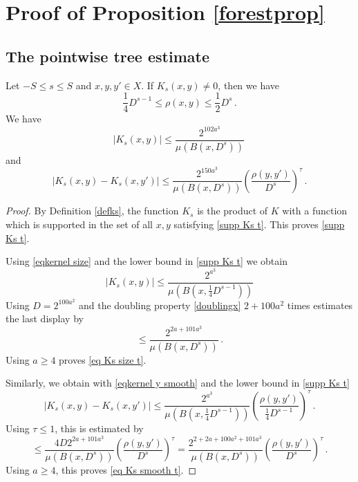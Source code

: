 \chapter{Proof of Proposition \ref{forestprop}}

\label{treesection}

\section{The pointwise tree estimate}


\begin{lemma}
Let $-S\le s\le S$ and $x,y,y'\in X$.
If $K_s(x,y)\neq 0$, then we have
\begin{equation}\label{supp Ks t}
    \frac{1}{4} D^{s-1} \leq \rho(x,y) \leq \frac{1}{2} D^s\, .
\end{equation}
We have
\begin{equation}
    \label{eq Ks size t}
    |K_s(x,y)|\le \frac{2^{102 a^3}}{\mu(B(x, D^{s}))}\,
\end{equation}
and \begin{equation}
    \label{eq Ks smooth t}
    |K_s(x,y)-K_s(x, y')|\le \frac{2^{150a^3}}{\mu(B(x, D^{s}))}
    \left(\frac{ \rho(y,y')}{D^s}\right)^{\tau}\,.
\end{equation}
\end{lemma}

\begin{proof}
By Definition \eqref{defks}, the function $K_s$ is the product of
$K$ with a function which is supported in the set of all
$x,y$ satisfying \eqref{supp Ks t}. This proves \eqref{supp Ks t}.

Using \eqref{eqkernel size} and the lower bound in \eqref{supp Ks t}
we obtain
\begin{equation}
|K_s(x,y)|\le \frac{2^{a^3}}{\mu(B(x,\frac 14 D^{s-1}))}
\end{equation}
Using $D=2^{100a^2}$
and the doubling property \eqref{doublingx} $2 +100a^2$ times estimates
the last display by
\begin{equation}
\label{eq Ks aux}
\le \frac{2^{2a+101a^3}}{\mu(B(x,  D^{s}))}\, .
\end{equation}
Using $a\ge 4$ proves \eqref{eq Ks size t}.


Similarly, we obtain with  \eqref{eqkernel y smooth} and the lower bound in
\eqref{supp Ks t}
\begin{equation}
    |K_s(x,y)-K_s(x, y')|\le \frac{2^{a^3}}{\mu(B(x, \frac 14 D^{s-1}))}
    \left(\frac{ \rho(y,y')}{\frac 14 D^{s-1}}\right)^{\tau}\,.
\end{equation}
Using $\tau\le 1$, this is estimated by
\begin{equation}
    \le \frac{4D 2^{2a+101a^3}}{\mu(B(x,  D^{s}))}
    \left(\frac{ \rho(y,y')}{D^{s}}\right)^{\tau}
        = \frac{2^{2+2a+100a^2+101a^3}}{\mu(B(x,  D^{s}))}
    \left(\frac{ \rho(y,y')}{D^{s}}\right)^{\tau}\,.
\end{equation}
Using $a\ge 4$, this proves  \eqref{eq Ks smooth t}.
\end{proof}

